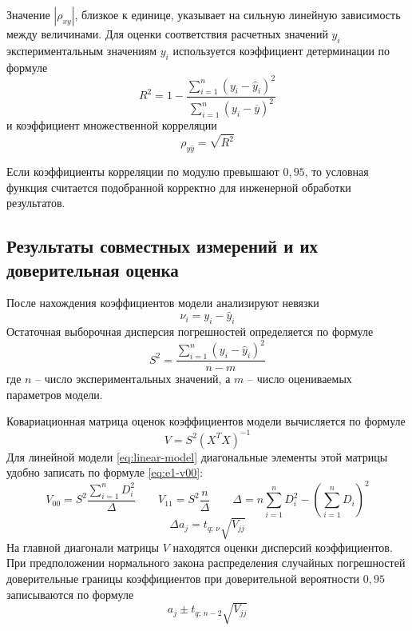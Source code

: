 \documentclass[12pt,a4paper]{article}
\begin{document}
Значение $|\rho_{xy}|$, близкое к единице, указывает на сильную линейную
зависимость между величинами. Для оценки соответствия расчетных значений
$\widehat{y}_i$ экспериментальным значениям $y_i$ используется коэффициент
детерминации по формуле 
\begin{equation}
R^2 = 1 - \frac{\sum\limits_{i = 1}^{n}(y_i - \widehat{y}_i)^2}
{\sum\limits_{i = 1}^{n}(y_i - \overline{y})^2}
\tag{6.2}
\label{eq:determination}
\end{equation}
и коэффициент множественной корреляции
\begin{equation*}
\rho_{y\widehat{y}} = \sqrt{R^2}
\tag{6.3}
\label{eq:multiple-correlation}
\end{equation*}

Если коэффициенты корреляции по модулю превышают $0,95$, то условная
функция считается подобранной корректно для инженерной обработки результатов.

\subsection{Результаты совместных измерений
и их доверительная оценка}

После нахождения коэффициентов модели анализируют невязки
\begin{equation*}
\nu_i = y_i - \widehat{y}_i
\end{equation*}
Остаточная выборочная дисперсия погрешностей определяется по формуле
\begin{equation}
S^2 = \frac{\sum\limits_{i = 1}^{n}\left(y_i - \widehat{y}_i\right)^2}{n - m}
\tag{7.1}
\label{eq:residual-variance}
\end{equation}
где $n$ – число экспериментальных значений, а $m$ – число оцениваемых
параметров модели.

Ковариационная матрица оценок коэффициентов модели вычисляется по формуле
\begin{equation}
V = S^2\left(X^TX\right)^{-1}
\tag{7.2}
\label{eq:covariance}
\end{equation}
Для линейной модели \eqref{eq:linear-model} диагональные элементы этой матрицы
удобно записать по формуле \eqref{eq:e1-v00}:
\begin{equation}
V_{00} = S^2\frac{\sum\limits_{i = 1}^{n}D_i^2}{\Delta}
\qquad
V_{11} = S^2\frac{n}{\Delta}
\qquad
\Delta = n\sum\limits_{i = 1}^{n}D_i^2 -
\left(\sum\limits_{i = 1}^{n}D_i\right)^2
\tag{7.2.1}
\label{eq:e1-v00}
\end{equation}
\begin{equation}
\Delta a_j = t_{q;\,\nu}\sqrt{V_{jj}}
\tag{7.2.2}
\label{eq:delta-coeff}
\end{equation}
На главной диагонали матрицы $V$ находятся оценки дисперсий коэффициентов.
При предположении нормального закона распределения случайных погрешностей
доверительные границы коэффициентов при доверительной вероятности $0,95$
записываются по формуле
\begin{equation}
a_j \pm t_{q;\,n-2}\sqrt{V_{jj}}
\tag{7.3}
\label{eq:confidence-coeff}
\end{equation}
\end{document}
